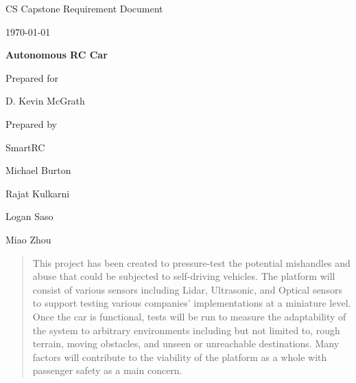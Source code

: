 \documentclass[onecolumn, draftclsnofoot,10pt]{IEEEtran}
\def \CapstoneTeamName{		    Team 42}
\def \GroupMemberOne{			Michael Burton}
\def \GroupMemberTwo{			Rajat Kulkarni}
\def \GroupMemberThree{			Logan Saso}
\def \GroupMemberFour{			Miao Zhou}
\def \CapstoneProjectName{		Autonomous RC Car}
\def \CapstoneSponsorPerson{	D. Kevin McGrath}
\def \DocType{	Requirement Document
				}
\newcommand{\NameSigPair}[1]{\par
\makebox[2.75in][r]{#1} \hfil 	\makebox[3.25in]{\makebox[2.25in]{\hrulefill} \hfill		\makebox[.75in]{\hrulefill}}
\par\vspace{-12pt} \textit{\tiny\noindent
\makebox[2.75in]{} \hfil		\makebox[3.25in]{\makebox[2.25in][r]{Signature} \hfill	\makebox[.75in][r]{Date}}}}
\renewcommand{\NameSigPair}[1]{#1}
\begin{document}
\begin{titlepage}
    \begin{singlespace}
        \hfill 
        \par\vspace{.2in}
        \centering
        \scshape{
            \huge CS Capstone \DocType \par
            {\large\today}\par
            \vspace{.5in}
            \textbf{\Huge\CapstoneProjectName}\par
            \vfill
            {\large Prepared for}\par
            \Huge \CapstoneSponsorCompany\par
            \vspace{5pt}
            {\Large\NameSigPair{\CapstoneSponsorPerson}\par}
            {\large Prepared by }\par
            SmartRC\par
            \vspace{5pt}
            {\Large
                \NameSigPair{\GroupMemberOne}\par
                \NameSigPair{\GroupMemberTwo}\par
                \NameSigPair{\GroupMemberThree}\par
                \NameSigPair{\GroupMemberFour}\par
            }
            \vspace{20pt}
        }
        \begin{abstract}
        This project has been created to pressure-test the potential mishandles and abuse that could be subjected to self-driving vehicles. The platform will consist of various sensors including Lidar, Ultrasonic, and Optical sensors to support testing various companies' implementations at a miniature level. Once the car is functional, tests will be run to measure the adaptability of the system to arbitrary environments including but not limited to, rough terrain, moving obstacles, and unseen or unreachable destinations. Many factors will contribute to the viability of the platform as a whole with passenger safety as a main concern. 
        \end{abstract}     
    \end{singlespace}
\end{titlepage}
\newpage
{}
\tableofcontents
\end{document}
